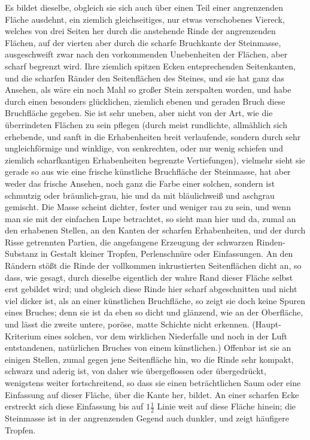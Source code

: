 \documentclass[a4paper, 11pt, oneside, german]{article}
\begin{document}
Es bildet dieselbe, obgleich sie sich auch über einen Teil einer angrenzenden Fläche ausdehnt, ein ziemlich gleichseitiges, nur etwas verschobenes Viereck, welches von drei Seiten her durch die anstehende Rinde der angrenzenden Flächen, auf der vierten aber durch die scharfe Bruchkante der Steinmasse, ausgeschweift zwar nach den vorkommenden Unebenheiten der Flächen, aber scharf begrenzt wird. Ihre ziemlich spitzen Ecken entsprechenden Seitenkanten, und die scharfen Ränder den Seitenflächen des Steines, und sie hat ganz das Ansehen, als wäre ein noch Mahl so großer Stein zerspalten worden, und habe durch einen besonders glücklichen, ziemlich ebenen und geraden Bruch diese Bruchfläche gegeben. Sie ist sehr uneben, aber nicht von der Art, wie die überrindeten Flächen zu sein pflegen (durch meist rundlichte, allmählich sich erhebende, und sanft in die Erhabenheiten breit verlaufende, sondern durch sehr ungleichförmige und winklige, von senkrechten, oder nur wenig schiefen und ziemlich scharfkantigen Erhabenheiten begrenzte Vertiefungen), vielmehr sieht sie gerade so aus wie eine frische künstliche Bruchfläche der Steinmasse, hat aber weder das frische Ansehen, noch ganz die Farbe einer solchen, sondern ist schmutzig oder bräunlich-grau, hie und da mit bläulichweiß und aschgrau gemischt. Die Masse scheint dichter, fester und weniger rau zu sein, und wenn man sie mit der einfachen Lupe betrachtet, so sieht man hier und da, zumal an den erhabenen Stellen, an den Kanten der scharfen Erhabenheiten, und der durch Risse getrennten Partien, die angefangene Erzeugung der schwarzen Rinden-Substanz in Gestalt kleiner Tropfen, Perlenschnüre oder Einfassungen. An den Rändern stößt die Rinde der vollkommen inkrustierten Seitenflächen dicht an, so dass, wie gesagt, durch dieselbe eigentlich der wahre Rand dieser Fläche selbst erst gebildet wird; und obgleich diese Rinde hier scharf abgeschnitten und nicht viel dicker ist, als an einer künstlichen Bruchfläche, so zeigt sie doch keine Spuren eines Bruches; denn sie ist da eben so dicht und glänzend, wie an der Oberfläche, und lässt die zweite untere, poröse, matte Schichte nicht erkennen. (Haupt-Kriterium eines solchen, vor dem wirklichen Niederfalle und noch in der Luft entstandenen, natürlichen Bruches von einem künstlichen.) Offenbar ist sie an einigen Stellen, zumal gegen jene Seitenfläche hin, wo die Rinde sehr kompakt, schwarz und aderig ist, von daher wie übergeflossen oder übergedrückt, wenigstens weiter fortschreitend, so dass sie einen beträchtlichen Saum oder eine Einfassung auf dieser Fläche, über die Kante her, bildet. An einer scharfen Ecke erstreckt sich diese Einfassung bis auf $1\frac{1}{2}$ Linie weit auf diese Fläche hinein; die Steinmasse ist in der angrenzenden Gegend auch dunkler, und zeigt häufigere Tropfen.
\end{document}
